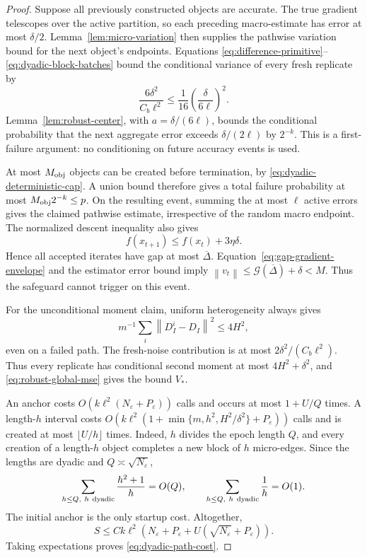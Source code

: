 \documentclass[11pt,a4paper]{article}
\newcommand{\eps}{\varepsilon}
\newcommand{\norm}[1]{\left\lVert #1\right\rVert}
\theoremstyle{remark}
\begin{document}
\begin{proof}
Suppose all previously constructed objects are accurate.  The true gradient
telescopes over the active partition, so each preceding macro-estimate has
error at most $\delta/2$.  Lemma~\ref{lem:micro-variation} then supplies the
pathwise variation bound for the next object's endpoints.  Equations
\eqref{eq:difference-primitive}--\eqref{eq:dyadic-block-batches} bound the
conditional variance of every fresh replicate by
\[
 \frac{6\delta^2}{C_b\ell^2}
 \le\frac1{16}\left(\frac{\delta}{6\ell}\right)^2.
\]
Lemma~\ref{lem:robust-center}, with $a=\delta/(6\ell)$, bounds the
conditional probability that the next aggregate error exceeds
$\delta/(2\ell)$ by $2^{-k}$.  This is a first-failure argument: no
conditioning on future accuracy events is used.

At most $M_{\rm obj}$ objects can be created before termination, by
\eqref{eq:dyadic-deterministic-cap}.  A union bound therefore gives a total
failure probability at most $M_{\rm obj}2^{-k}\le p$.
On the resulting event, summing the at most $\ell$ active errors gives the
claimed pathwise estimate, irrespective of the random macro endpoint.
The normalized descent inequality also gives
\[
 f(x_{t+1})\le f(x_t)+3\eta\delta.
\]
Hence all accepted iterates have gap at most $\overline\Delta$.
Equation~\eqref{eq:gap-gradient-envelope} and the estimator error bound imply
$\norm{v_t}\le\mathcal G(\overline\Delta)+\delta<M$.
Thus the safeguard cannot trigger on this event.

For the unconditional moment claim, uniform heterogeneity always gives
\[
 m^{-1}\sum_i\norm{D^i_I-D_I}^2\le4H^2,
\]
even on a failed path.
The fresh-noise contribution is at most
$2\delta^2/(C_b\ell^2)$.  Thus every replicate has conditional second
moment at most $4H^2+\delta^2$, and
\eqref{eq:robust-global-mse} gives the bound $V_*$.

 An anchor costs $O(k\ell^2(N_\eps+P_\eps))$ calls and occurs at most
 $1+U/Q$ times.  A length-$h$ interval costs
 $O(k\ell^2(1+\min\{m,h^2,H^2/\delta^2\}+P_\eps))$ calls and is created
 at most $\lfloor U/h\rfloor$ times.  Indeed, $h$ divides the epoch length
 $Q$, and every creation of a length-$h$ object completes a new block of
 $h$ micro-edges.  Since the lengths are dyadic and
 $Q\asymp\sqrt{N_\eps}$,
\[
 \sum_{h\le Q,\ h\ {\rm dyadic}}\frac{h^2+1}{h}=O(Q),
 \qquad
 \sum_{h\le Q,\ h\ {\rm dyadic}}\frac1h=O(1).
\]
 The initial anchor is the only startup cost.  Altogether,
 \[
  S\le Ck\ell^2\left(N_\eps+P_\eps+
           U(\sqrt{N_\eps}+P_\eps)\right).
 \]
 Taking expectations proves \eqref{eq:dyadic-path-cost}.
\end{proof}
\end{document}
